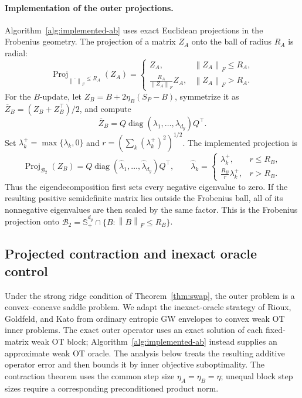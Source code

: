 \documentclass[11pt]{article}
\newcommand{\norm}[1]{\left\lVert #1\right\rVert}
\theoremstyle{plain}
\theoremstyle{definition}
\theoremstyle{remark}
\begin{document}
\paragraph{Implementation of the outer projections.}
Algorithm~\ref{alg:implemented-ab} uses exact Euclidean projections in the
Frobenius geometry. The projection of a matrix \(Z_A\) onto the ball of radius
\(R_A\) is radial:
\[
 \operatorname{Proj}_{\norm{\cdot}_F\le R_A}(Z_A)
 =
 \begin{cases}
  Z_A,&\norm{Z_A}_F\le R_A,\\[2pt]
  \displaystyle\frac{R_A}{\norm{Z_A}_F}Z_A,&\norm{Z_A}_F>R_A.
 \end{cases}
\]
For the \(B\)-update, let \(Z_B=B+2\eta_B(S_P-B)\), symmetrize it as
\(\overline Z_B=(Z_B+Z_B^\top)/2\), and compute
\[
 \overline Z_B=Q\operatorname{diag}(\lambda_1,\ldots,\lambda_{d_y})Q^\top.
\]
Set \(\lambda_k^+=\max\{\lambda_k,0\}\) and
\(r=(\sum_k(\lambda_k^+)^2)^{1/2}\). The implemented projection is
\[
 \operatorname{Proj}_{\mathcal B_2}(Z_B)
 =Q\operatorname{diag}(\widehat\lambda_1,\ldots,\widehat\lambda_{d_y})Q^\top,
 \qquad
 \widehat\lambda_k=
 \begin{cases}
  \lambda_k^+,&r\le R_B,\\[2pt]
  \displaystyle\frac{R_B}{r}\lambda_k^+,&r>R_B.
 \end{cases}
\]
Thus the eigendecomposition first sets every negative eigenvalue to zero. If
the resulting positive semidefinite matrix lies outside the Frobenius ball, all
of its nonnegative eigenvalues are then scaled by the same factor. This is the
Frobenius projection onto
\(\mathcal B_2=\mathbb S_+^{d_y}\cap\{B:\norm B_F\le R_B\}\).

\subsection{Projected contraction and inexact oracle control}
\label{subsec:convergence-inexact-oracle}

Under the strong ridge condition of Theorem~\ref{thm:swap}, the outer problem is
a convex--concave saddle problem. We adapt the inexact-oracle strategy of Rioux,
Goldfeld, and Kato \cite{RiouxGoldfeldKato2024} from ordinary entropic GW
envelopes to convex weak OT inner problems. The exact outer operator uses an exact
solution of each fixed-matrix weak OT block; Algorithm~\ref{alg:implemented-ab}
instead supplies an approximate weak OT oracle. The analysis below treats the
resulting additive operator error and then bounds it by inner objective
suboptimality. The contraction theorem uses the common step size
\(\eta_A=\eta_B=\eta\); unequal block step sizes require a corresponding
preconditioned product norm.
\end{document}
